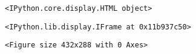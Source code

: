 \documentclass[11pt]{article}
\begin{document}
    
    \begin{verbatim}
<IPython.core.display.HTML object>
    \end{verbatim}

    
    
    \begin{verbatim}
<IPython.lib.display.IFrame at 0x11b937c50>
    \end{verbatim}

    
    
    \begin{verbatim}
<Figure size 432x288 with 0 Axes>
    \end{verbatim}

    

    
    
    
    
\end{document}
